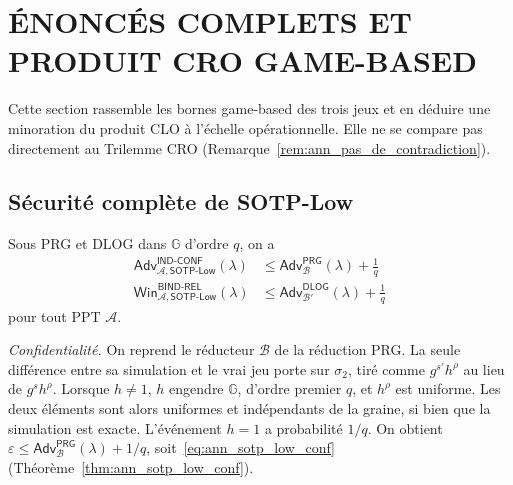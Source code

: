 \section{\'ENONC\'ES COMPLETS ET PRODUIT CRO GAME-BASED}
\label{sec:gamebased_produitCRO}
\begin{sloppypar}

Cette section rassemble les bornes game-based des trois jeux et en d\'eduire une
minoration du produit CLO \`a l'\'echelle op\'erationnelle. Elle ne se compare pas
directement au Trilemme CRO (Remarque~\ref{rem:ann_pas_de_contradiction}).

\subsection{S\'ecurit\'e compl\`ete de SOTP-Low}

\begin{theorem}\label{thm:ann_sotp_low_games}
Sous PRG et DLOG dans $\mathbb{G}$ d'ordre $q$, on a
\begin{align}
\mathsf{Adv}^{\mathsf{IND\text{-}CONF}}_{\mathcal{A},\mathsf{SOTP\text{-}Low}}(\lambda)
&\leq \mathsf{Adv}^{\mathsf{PRG}}_{\mathcal{B}}(\lambda)
    + \frac{1}{q}
\label{eq:ann_sotp_low_conf} \\[4pt]
\mathsf{Win}^{\mathsf{BIND\text{-}REL}}_{\mathcal{A},\mathsf{SOTP\text{-}Low}}(\lambda)
&\leq \mathsf{Adv}^{\mathsf{DLOG}}_{\mathcal{B}'}(\lambda)
    + \frac{1}{q}
\label{eq:ann_sotp_low_rel}
\end{align}
pour tout PPT $\mathcal{A}$.
\end{theorem}

\begin{Preuve}
\emph{Confidentialit\'e.} On reprend le r\'educteur $\mathcal{B}$ de la r\'eduction PRG.
La seule diff\'erence entre sa simulation et le vrai jeu porte sur $\sigma_2$, tir\'e
comme $g^{s'}h^{\rho}$ au lieu de $g^{s}h^{\rho}$. Lorsque $h \neq 1$, $h$ engendre
$\mathbb{G}$, d'ordre premier $q$, et $h^\rho$ est uniforme. Les deux \'el\'ements sont
alors uniformes et ind\'ependants de la graine, si bien que la simulation est
exacte. L'\'ev\'enement $h = 1$ a probabilit\'e $1/q$. On obtient
$\varepsilon \leq \mathsf{Adv}^{\mathsf{PRG}}_{\mathcal{B}}(\lambda) + 1/q$, soit~\eqref{eq:ann_sotp_low_conf}
(Th\'eor\`eme~\ref{thm:ann_sotp_low_conf}).


\end{Preuve}
\end{sloppypar}
